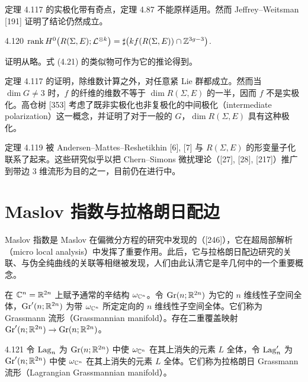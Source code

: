 
定理 4.117 的实极化带有奇点，定理 4.87 不能原样适用。然而 Jeffrey–Weitsman [191] 证明了结论仍然成立。

\begin{theorem}{4.120}
  $\operatorname{rank} H^0\bigl(R(\Sigma,E);\mathcal{L}^{\otimes k}\bigr) = \sharp\bigl(kf(R(\Sigma,E))\cap \mathbb{Z}^{3g-3}\bigr)$.
\end{theorem}

证明从略。式 (4.21) 的类似物可作为它的推论得到。

定理 4.117 的证明，除维数计算之外，对任意紧 Lie 群都成立。然而当 $\dim G\neq 3$ 时，$f$ 的纤维的维数不等于 $\dim R(\Sigma,E)$ 的一半，因而 $f$ 不是实极化。高仓树 [353] 考虑了既非实极化也非复极化的中间极化（intermediate polarization）这一概念，并证明了对于一般的 $G$，$\dim R(\Sigma,E)$ 具有这种极化。

定理 4.119 被 Andersen–Mattes–Reshetikhin [6], [7] 与 $R(\Sigma,E)$ 的形变量子化联系了起来。这些研究似乎以把 Chern–Simons 微扰理论（[27], [28], [217]）推广到带边 3 维流形为目的之一，目前仍在进行中。

\section{Maslov 指数与拉格朗日配边}


Maslov 指数是 Maslov 在偏微分方程的研究中发现的（[246]），它在超局部解析（micro local analysis）中发挥了重要作用。此后，它与拉格朗日配边研究的关联、与伪全纯曲线的关联等相继被发现，人们由此认清它是辛几何中的一个重要概念。

在 $\mathbb{C}^n=\mathbb{R}^{2n}$ 上赋予通常的辛结构 $\omega_{\mathbb{C}^n}$。令 $\operatorname{Gr}(n;\mathbb{R}^{2n})$ 为它的 $n$ 维线性子空间全体，$\operatorname{Gr}'(n;\mathbb{R}^{2n})$ 为带 $\omega_{\mathbb{C}^n}$ 所定定向的 $n$ 维线性子空间全体。它们称为 Grassmann 流形（Grassmannian manifold）。存在二重覆盖映射 $\operatorname{Gr}'(n;\mathbb{R}^{2n})\to\operatorname{Gr}(n;\mathbb{R}^{2n})$。

\begin{definition}{4.121}
  令 $\operatorname{Lag}_n$ 为 $\operatorname{Gr}(n;\mathbb{R}^{2n})$ 中使 $\omega_{\mathbb{C}^n}$ 在其上消失的元素 $L$ 全体，令 $\operatorname{Lag}'_n$ 为 $\operatorname{Gr}'(n;\mathbb{R}^{2n})$ 中使 $\omega_{\mathbb{C}^n}$ 在其上消失的元素 $L$ 全体。它们称为拉格朗日 Grassmann 流形（Lagrangian Grassmannian manifold）。
\end{definition}

